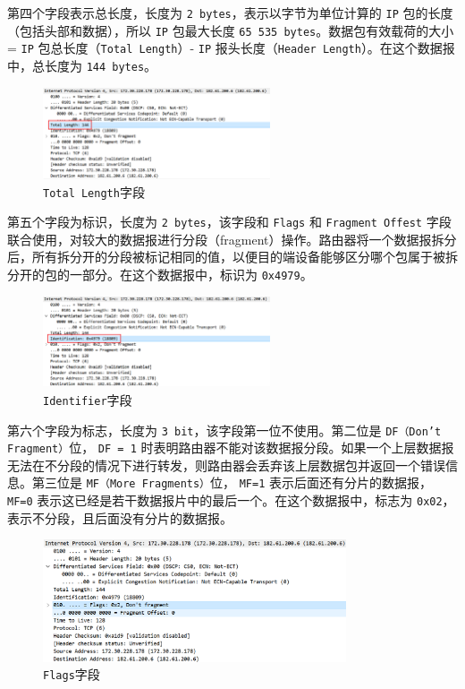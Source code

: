 \documentclass{article}
\begin{document}
第四个字段表示总长度，长度为 \texttt{2 bytes}，表示以字节为单位计算的 \texttt{IP} 包的长度（包括头部和数据），所以 \texttt{IP} 包最大长度 \texttt{65 535 bytes}。数据包有效载荷的大小 = \texttt{IP} 包总长度（\texttt{Total Length}）- \texttt{IP} 报头长度（\texttt{Header Length}）。在这个数据报中，总长度为 \texttt{144 bytes}。


\begin{figure}[H]
  \centering
  \includegraphics[width=0.6\textwidth]{img/12.png}
  \caption{\texttt{Total Length}字段}
  \label{fig:10}
\end{figure}

第五个字段为标识，长度为 \texttt{2 bytes}，该字段和 \texttt{Flags} 和 \texttt{Fragment Offest} 字段联合使用，对较大的数据报进行分段（fragment）操作。路由器将一个数据报拆分后，所有拆分开的分段被标记相同的值，以便目的端设备能够区分哪个包属于被拆分开的包的一部分。在这个数据报中，标识为 \texttt{0x4979}。

\begin{figure}[H]
  \centering
  \includegraphics[width=0.6\textwidth]{img/13.png}
  \caption{\texttt{Identifier}字段}
  \label{fig:11}
\end{figure}

第六个字段为标志，长度为 \texttt{3 bit}，该字段第一位不使用。第二位是 \texttt{DF（Don’t Fragment）}位， \texttt{DF = 1} 时表明路由器不能对该数据报分段。如果一个上层数据报无法在不分段的情况下进行转发，则路由器会丢弃该上层数据包并返回一个错误信息。第三位是 \texttt{MF（More Fragments）}位， \texttt{MF=1} 表示后面还有分片的数据报， \texttt{MF=0} 表示这已经是若干数据报片中的最后一个。在这个数据报中，标志为 \texttt{0x02}，表示不分段，且后面没有分片的数据报。

\begin{figure}[H]
  \centering
  \includegraphics[width=0.8\textwidth]{img/14.png}
  \caption{\texttt{Flags}字段}
  \label{fig:12}
\end{figure}
\end{document}
